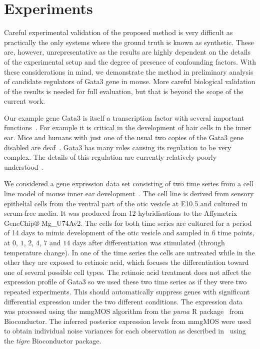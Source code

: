 \documentclass{article}
\begin{document}
\section{Experiments}


Careful experimental validation of the proposed method is very
difficult as practically the only systems where the ground truth is
known as synthetic.  These are, however, unrepresentative as the
results are highly dependent on the details of the experimental setup
and the degree of presence of confounding factors.  With these
considerations in mind, we demonstrate the method in preliminary
analysis of candidate regulators of Gata3 gene in  mouse.  More
careful biological validation of the results is needed for full
evaluation, but that is beyond the scope of the current work.

Our example gene Gata3 is itself   a transcription factor with several
important  functions~\cite{Chou2010}.  For example  it is  critical in
the development of hair cells in  the inner ear.  Mice and humans with
just  one of  the usual  two  copies of  the Gata3  gene disabled  are
deaf~\cite{Esch2000}.  Gata3 has many  roles causing its regulation to
be  very  complex.  The  details  of  this  regulation  are  currently
relatively poorly understood~\cite{Burch2005}.

We considered a gene expression data set consisting of two time series
from     a    cell     line     model    of     mouse    inner     ear
development~\cite{Helyer:model07}.   The  cell  line is  derived  from
sensory epithelial cells from the  ventral part of the otic vesicle at
E10.5  and cultured  in  serum-free  media. It  was  produced from  12
hybridisations to  the Affymetrix GeneChip® Mg\_U74Av2.  The cells for
both  time series  are  cultured for  a  period of  14  days to  mimic
development of  the otic  vesicle and sampled  in $6$ time  points, at
$0$,  $1$, $2$,  $4$,  $7$  and $14$  days  after differentiation  was
stimulated (through  temperature change).  In  one of the  time series
the  cells  are untreated  while  in the  other  they  are exposed  to
retinoic acid, which focuses the differentiation toward one of several
possible cell types.  The retinoic  acid treatment does not affect the
expression profile  of Gata3 so  we used these  two time series  as if
they  were  two   repeated  experiments.   This  should  automatically
suppress genes with significant  differential expression under the two
different  conditions.  The  expression data  was processed  using the
mmgMOS       algorithm        from       the       \emph{puma}       R
package~\cite{Liu:tractable04,Pearson:puma09}  from Bioconductor.  The
inferred posterior  expression levels from mmgMOS were  used to obtain
individual   noise  variances  for   each  observation   as  described
in~\cite{Honkela:modelbased10}  using  the  \emph{tigre}  Bioconductor
package. %
\end{document}
